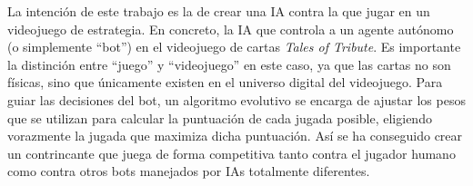La intención de este trabajo es la de crear una IA contra la que jugar en un videojuego de estrategia. En concreto, la IA que controla a un agente autónomo (o simplemente ``bot'') en el videojuego de cartas \textit{Tales of Tribute}. Es importante la distinción entre ``juego'' y ``videojuego'' en este caso, ya que las cartas no son físicas, sino que únicamente existen en el universo digital del videojuego. Para guiar las decisiones del bot, un algoritmo evolutivo se encarga de ajustar los pesos que se utilizan para calcular la puntuación de cada jugada posible, eligiendo vorazmente la jugada que maximiza dicha puntuación. Así se ha conseguido crear un contrincante que juega de forma competitiva tanto contra el jugador humano como contra otros bots manejados por IAs totalmente diferentes.